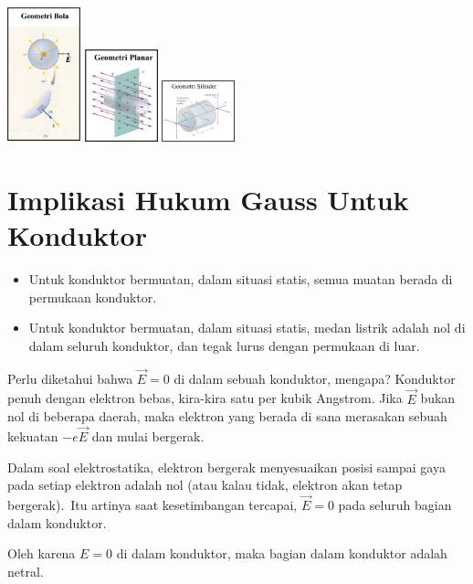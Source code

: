 \documentclass[twocolumn, 11pt]{article}%
\begin{document}
    \begin{center}
        \includegraphics[width=80px]{13.png}
        \includegraphics[width=80px]{14.png}
        \includegraphics[width=80px]{15.png}
    \end{center}

    \section{Implikasi Hukum Gauss Untuk Konduktor}%
    \begin{itemize}
        \item Untuk konduktor bermuatan, dalam situasi statis, semua muatan berada di permukaan konduktor.
        \item Untuk konduktor bermuatan, dalam situasi statis, medan listrik adalah nol di dalam seluruh konduktor, dan tegak lurus dengan permukaan di luar.
    \end{itemize}

    Perlu diketahui bahwa $\vec E = 0$ di dalam sebuah konduktor, mengapa? Konduktor penuh dengan elektron bebas, kira-kira satu per kubik Angstrom. Jika $\vec E$ bukan nol di beberapa  daerah, maka elektron yang berada di sana merasakan sebuah kekuatan $-e\vec E$ dan mulai bergerak.

    Dalam soal elektrostatika, elektron bergerak menyesuaikan posisi sampai gaya pada setiap elektron adalah nol (atau kalau tidak, elektron akan tetap bergerak). Itu artinya saat kesetimbangan tercapai, $\vec E =0$ pada seluruh bagian dalam konduktor.

    Oleh karena $E=0$ di dalam konduktor, maka bagian dalam konduktor adalah netral.
\end{document}
